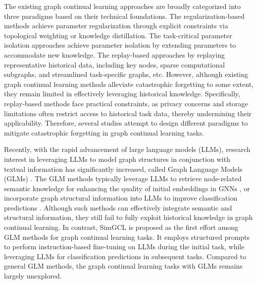 \documentclass[sigconf]{acmart}
\begin{document}
The existing graph continual learning approaches are broadly categorized into three paradigms based on their technical foundations.
The regularization-based methods \cite{Re,Re_2} achieve parameter regularization through explicit constraints via topological weighting or knowledge distillation.
The task-critical parameter isolation approaches \cite{is,is_2} achieve parameter isolation by extending parameters to accommodate new knowledge.
The replay-based approaches \cite{rh,rh_2} by replaying representative historical data, including key nodes, sparse computational subgraphs, and streamlined task-specific graphs, etc.
However, although existing graph continual learning methods alleviate catastrophic forgetting to some extent, they remain limited in effectively leveraging historical knowledge.
Specifically, replay-based methods face practical constraints, as privacy concerns and storage limitations often restrict access to historical task data, thereby undermining their applicability.
Therefore, several studies attempt to design different paradigms to mitigate catastrophic forgetting in graph continual learning tasks.



Recently, with the rapid advancement of large language models (LLMs), research interest in leveraging LLMs to model graph structures in conjunction with textual information has significantly increased, called Graph Language Models (GLMs) \cite{Roberta,SimpleCIL}.
The GLM methods typically leverage LLMs to retrieve node-related semantic knowledge for enhancing the quality of initial embeddings in GNNs \cite{GCN_emb,ENGINE}, or incorporate graph structural information into LLMs to improve classification predictions \cite{Graphgpt,Llaga}.
Although such methods can effectively integrate semantic and structural information, they still fail to fully exploit historical knowledge in graph continual learning.
In contrast, SimGCL \cite{SimGCL} is proposed as the first effort among GLM methods for graph continual learning tasks. 
It employs structured prompts to perform instruction-based fine-tuning on LLMs during the initial task, while leveraging LLMs for classification predictions in subsequent tasks.
Compared to general GLM methods, the graph continual learning tasks with GLMs remains largely unexplored.
\end{document}
